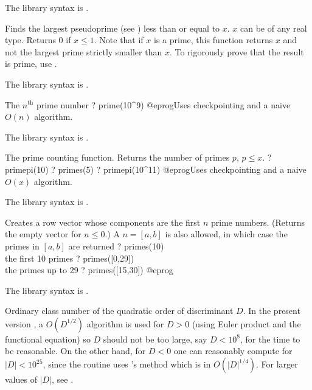 The library syntax is .

\label{se:precprime}
Finds the largest pseudoprime (see
) less than or equal to $x$. $x$ can be of any real type.
Returns 0 if $x\le1$. Note that if $x$ is a prime, this function returns $x$
and not the largest prime strictly smaller than $x$. To rigorously prove that
the result is prime, use .

The library syntax is .

\label{se:prime}
The $n^{\text{th}}$ prime number
\bprog
? prime(10^9)
@eprog\noindent Uses checkpointing and a naive $O(n)$ algorithm.

The library syntax is .

\label{se:primepi}
The prime counting function. Returns the number of
primes $p$, $p \leq x$.
\bprog
? primepi(10)
? primes(5)
? primepi(10^11)
@eprog\noindent Uses checkpointing and a naive $O(x)$ algorithm.

The library syntax is .

\label{se:primes}
Creates a row vector whose components are the first $n$ prime numbers.
(Returns the empty vector for $n \leq 0$.) A  $n = [a,b]$ is also
allowed, in which case the primes in $[a,b]$ are returned
\bprog
? primes(10)     \\ the first 10 primes
? primes([0,29])  \\ the primes up to 29
? primes([15,30])
@eprog

The library syntax is .

\label{se:qfbclassno}
Ordinary class number of the quadratic
order of discriminant $D$. In the present version \vers, a $O(D^{1/2})$
algorithm is used for $D > 0$ (using Euler product and the functional
equation) so $D$ should not be too large, say $D < 10^8$, for the time to be
reasonable. On the other hand, for $D < 0$ one can reasonably compute
 for $|D|<10^{25}$, since the routine uses
's method which is in $O(|D|^{1/4})$. For larger values of $|D|$,
see .

